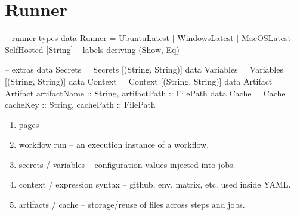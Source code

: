 \documentclass[openany, 12pt]{book}
\begin{document}
\chapter{Runner}
\begin{haskell}{}
-- runner types
data Runner
    = UbuntuLatest
    | WindowsLatest
    | MacOSLatest
    | SelfHosted [String] -- labels
deriving (Show, Eq)

-- extras
data Secrets   = Secrets   [(String, String)]
data Variables = Variables [(String, String)]
data Context   = Context    [(String, String)]
data Artifact  = Artifact
    { artifactName :: String,
      artifactPath :: FilePath }
data Cache     = Cache
    { cacheKey :: String,
      cachePath :: FilePath }
\end{haskell}

\begin{enumerate}[label = {(\arabic*)}]
	\item pages
	\item workflow run – an execution instance of a workflow.
	\item secrets / variables – configuration values injected into jobs.
	\item context / expression syntax – github, env, matrix, etc. used inside YAML.
	\item artifacts / cache – storage/reuse of files across steps and jobs.
\end{enumerate}
\end{document}
